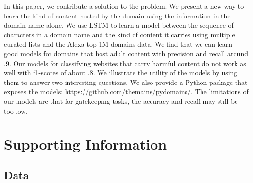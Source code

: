 \documentclass[12pt, letterpaper]{article}
\begin{document}
In this paper, we contribute a solution to the problem. We present a new way to learn the kind of content hosted by the domain using the information in the domain name alone. We use LSTM to learn a model between the sequence of characters in a domain name and the kind of content it carries using multiple curated lists and the Alexa top 1M domains data. We find that we can learn good models for domains that host adult content with precision and recall around .9. Our models for classifying websites that carry harmful content do not work as well with f1-scores of about .8. We illustrate the utility of the models by using them to answer two interesting questions. We also provide a Python package that exposes the models: \url{https://github.com/themains/pydomains/}. The limitations of our models are that for gatekeeping tasks, the accuracy and recall may still be too low.
\clearpage


\clearpage
\appendix
\renewcommand{\thesection}{SI \arabic{section}}
\renewcommand\thetable{\thesection.\arabic{table}}
\renewcommand\thefigure{\thesection.\arabic{figure}}

\section{Supporting Information}

\subsection{Data}
\end{document}
